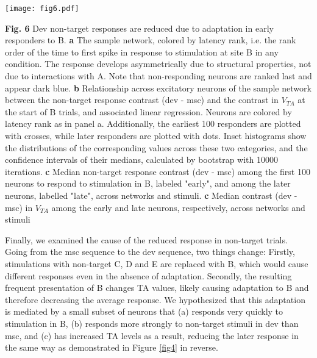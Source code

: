 \documentclass[pdflatex,referee,iicol,sn-basic]{sn-jnl}
\theoremstyle{thmstyleone}%
\theoremstyle{thmstyletwo}%
\theoremstyle{thmstylethree}%
\begin{document}
\begin{figure*}%
    \centering
    \texttt{[image: fig6.pdf]}
    \caption{}
    \label{fig6}
\end{figure*}
\textbf{Fig. 6} Dev non-target responses are reduced due to adaptation in early responders to B.
\textbf{a} The sample network, colored by latency rank, i.e. the rank order of the time to first spike in response to stimulation at site B in any condition. The response develops asymmetrically due to structural properties, not due to interactions with A. Note that non-responding neurons are ranked last and appear dark blue.
\textbf{b} Relationship across excitatory neurons of the sample network between the non-target response contrast (dev - msc) and the contrast in $V_{TA}$ at the start of B trials, and associated linear regression. Neurons are colored by latency rank as in panel a. Additionally, the earliest 100 responders are plotted with crosses, while later responders are plotted with dots. Inset histograms show the distributions of the corresponding values across these two categories, and the confidence intervals of their medians, calculated by bootstrap with 10000 iterations.
\textbf{c} Median non-target response contrast (dev - msc) among the first 100 neurons to respond to stimulation in B, labeled "early", and among the later neurons, labelled "late", across networks and stimuli.
\textbf{c} Median contrast (dev - msc) in $V_{TA}$ among the early and late neurons, respectively, across networks and stimuli

Finally, we examined the cause of the reduced response in non-target trials. Going from the msc sequence to the dev sequence, two things change: Firstly, stimulations with non-target C, D and E are replaced with B, which would cause different responses even in the absence of adaptation. Secondly, the resulting  frequent presentation of B changes TA values, likely causing adaptation to B and therefore decreasing the average response. We hypothesized that this adaptation is mediated by a small subset of neurons that (a) responds very quickly to stimulation in B, (b) responds more strongly to non-target stimuli in dev than msc, and (c) has increased TA levels as a result, reducing the later response in the same way as demonstrated in Figure \ref{fig4} in reverse.
\end{document}
